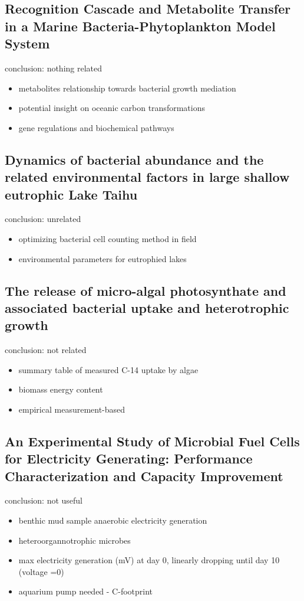 \documentclass[a4paper,11pt]{article}
\begin{document}
    \subsection{Recognition Cascade and Metabolite Transfer in a Marine Bacteria-Phytoplankton Model System\autocite{durham2017recognition}}
    conclusion: nothing related
    \begin{itemize}
        \item metabolites relationship towards bacterial growth mediation
        \item potential insight on oceanic carbon transformations
        \item gene regulations and biochemical pathways
    \end{itemize}
    
    \subsection{Dynamics of bacterial abundance and the related environmental factors in large shallow eutrophic Lake Taihu\autocite{gong2017dynamics}}
    conclusion: unrelated
    \begin{itemize}
        \item optimizing bacterial cell counting method in field
        \item environmental parameters for eutrophied lakes
    \end{itemize}
    
    \subsection{The release of micro-algal photosynthate and associated bacterial uptake and heterotrophic growth\autocite{jones1986release}}
    conclusion: not related
    \begin{itemize}
        \item summary table of measured C-14 uptake by algae
        \item biomass energy content
        \item empirical measurement-based
    \end{itemize}
    
    \subsection{An Experimental Study of Microbial Fuel Cells for Electricity Generating: Performance Characterization and Capacity Improvement\autocite{li2013experimental}}
    conclusion: not useful
    \begin{itemize}
        \item benthic mud sample anaerobic electricity generation
        \item heteroorgannotrophic microbes
        \item max electricity generation (mV) at day 0, linearly dropping until day 10 (voltage =0)
        \item aquarium pump needed - C-footprint
    \end{itemize}
    
\end{document}
